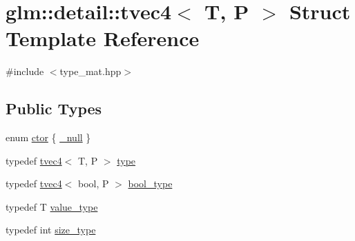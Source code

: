 \hypertarget{structglm_1_1detail_1_1tvec4}{}\section{glm\+:\+:detail\+:\+:tvec4$<$ T, P $>$ Struct Template Reference}
\label{structglm_1_1detail_1_1tvec4}


{\ttfamily \#include $<$type\+\_\+mat.\+hpp$>$}

\subsection*{Public Types}
\begin{DoxyCompactItemize}
\item 
enum \hyperlink{structglm_1_1detail_1_1tvec4_a931ed25f812335023097a513240ae102}{ctor} \{ \hyperlink{structglm_1_1detail_1_1tvec4_a931ed25f812335023097a513240ae102a3dbae54a695116b6fb8635a42fbf83f8}{\+\_\+null}
 \}
\item 
typedef \hyperlink{structglm_1_1detail_1_1tvec4}{tvec4}$<$ T, P $>$ \hyperlink{structglm_1_1detail_1_1tvec4_a6f73aac80b830832bddd293627bd79b1}{type}
\item 
typedef \hyperlink{structglm_1_1detail_1_1tvec4}{tvec4}$<$ bool, P $>$ \hyperlink{structglm_1_1detail_1_1tvec4_ae066d27ec9adb11c25f37abe9b3a4161}{bool\+\_\+type}
\item 
typedef T \hyperlink{structglm_1_1detail_1_1tvec4_a9fefebb21a1ed7cdabd61fc4f0b8e28e}{value\+\_\+type}
\item 
typedef int \hyperlink{structglm_1_1detail_1_1tvec4_a92061c78c7801c2cedb6c1bae68d1fd4}{size\+\_\+type}
\end{DoxyCompactItemize}
